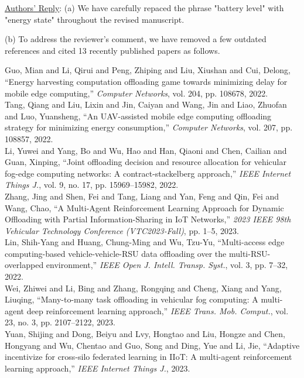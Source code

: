 \documentclass[12pt,draftclsnofoot,onecolumn]{IEEEtran}
\newcommand{\rev}[1]{{\color{blue}#1}} %
\newcommand{\rev}[1]{#1}
\newenvironment{my}[2]%
{\begin{list}{}%
{\setlength{\rightmargin}{#1}\setlength{\leftmargin}{#2}}%


 \item[]{}

} {\end{list}}
\begin{document}
\begin{enumerate}
\underline{Authors' Reply}: (a) We have carefully repaced the phrase "battery level" with "energy state" throughout the revised manuscript. \newline

(b) To address the reviewer’s comment, we have removed a few outdated references and cited 13 recently published papers as follows. \newline

		\begin{my}{1cm}{1cm}
	\rev{
		{\small
			\noindent\hspace{-0.3mm}\cite{guo2022energy} Guo, Mian and Li, Qirui and Peng, Zhiping and Liu, Xiushan and Cui, Delong, ``Energy harvesting computation offloading game towards minimizing delay for mobile edge computing,'' \textit{Computer Networks}, vol. 204, pp. 108678, 2022.\\[6pt]
			\cite{tang2022uav} Tang, Qiang and Liu, Lixin and Jin, Caiyan and Wang, Jin and Liao, Zhuofan and Luo, Yuansheng, ``An UAV-assisted mobile edge computing offloading strategy for minimizing energy consumption,'' \textit{Computer Networks}, vol. 207, pp. 108857, 2022.\\[6pt]
			\cite{li2022joint} Li, Yuwei and Yang, Bo and Wu, Hao and Han, Qiaoni and Chen, Cailian and Guan, Xinping, ``Joint offloading decision and resource allocation for vehicular fog-edge computing networks: A contract-stackelberg approach,'' \textit{IEEE Internet Things J.}, vol. 9, no. 17, pp. 15969--15982, 2022.\\[6pt]
			\cite{zhang2023multi} Zhang, Jing and Shen, Fei and Tang, Liang and Yan, Feng and Qin, Fei and Wang, Chao, ``A Multi-Agent Reinforcement Learning Approach for Dynamic Offloading with Partial Information-Sharing in IoT Networks,'' \textit{2023 IEEE 98th Vehicular Technology Conference (VTC2023-Fall)}, pp. 1--5, 2023.\\[6pt]
			\cite{lin2022multi} Lin, Shih-Yang and Huang, Chung-Ming and Wu, Tzu-Yu, ``Multi-access edge computing-based vehicle-vehicle-RSU data offloading over the multi-RSU-overlapped environment,'' \textit{IEEE Open J. Intell. Transp. Syst.}, vol. 3, pp. 7--32, 2022.\\[6pt]
			\cite{wei2023many} Wei, Zhiwei and Li, Bing and Zhang, Rongqing and Cheng, Xiang and Yang, Liuqing, ``Many-to-many task offloading in vehicular fog computing: A multi-agent deep reinforcement learning approach,'' \textit{IEEE Trans. Mob. Comput.}, vol. 23, no. 3, pp. 2107--2122, 2023.\\[6pt]
			\cite{yuan2023adaptive} Yuan, Shijing and Dong, Beiyu and Lvy, Hongtao and Liu, Hongze and Chen, Hongyang and Wu, Chentao and Guo, Song and Ding, Yue and Li, Jie, ``Adaptive incentivize for cross-silo federated learning in IIoT: A multi-agent reinforcement learning approach,'' \textit{IEEE Internet Things J.}, 2023.\\[6pt]
}}
\end{my}
\end{enumerate}
\end{document}

